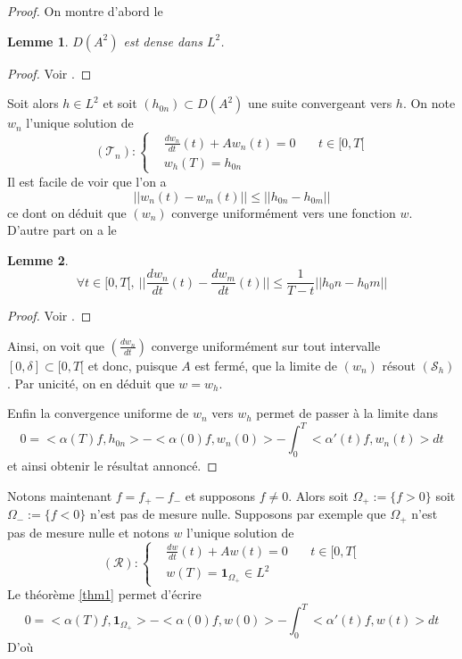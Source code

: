 \documentclass[a4paper]{book}
\newtheorem{lem}{Lemme}[chapter]
\begin{document}
\begin{proof}
    On montre d'abord le
    \begin{lem}
        $D(A^2)$ est dense dans $L^2$.
    \end{lem}
    \begin{proof}
        Voir \cite{HB}.
    \end{proof}
    Soit alors $h\in L^2$ et soit $(h_{0n})\subset D(A^2)$ une suite convergeant vers $h$. On note $w_n$ l'unique solution de
    \[(\mathcal{T}_n):\left\lbrace\begin{aligned}
             & \frac{dw_n}{dt}(t)+A w_n(t)=0 & \  & t\in[0,T[ \\
             & w_h(T)=h_{0n}
        \end{aligned}\right. \]
    Il est facile de voir que l'on a
    \[||w_n(t)-w_m(t)||\leq ||h_{0n}-h_{0m}|| \]
    ce dont on déduit que $(w_n)$ converge uniformément vers une fonction $w$.
    D'autre part on a le
    \begin{lem}
        \[\forall t\in [0,T[,\ ||\frac{dw_n}{dt}(t)-\frac{dw_m}{dt}(t)||\leq\frac{1}{T-t} ||h_0n-h_0m|| \]
    \end{lem}
    \begin{proof}
        Voir \cite{HB}.
    \end{proof}
    Ainsi, on voit que $(\frac{dw_n}{dt})$ converge uniformément sur tout intervalle $[0,\delta]\subset [0,T[$ et donc, puisque $A$ est fermé, que la limite de $(w_n)$ résout $(\mathcal{S}_h)$. Par unicité, on en déduit que $w=w_h$.

    Enfin la convergence uniforme de $w_n$ vers $w_h$ permet de passer à la limite dans
    \[0=<\alpha(T)f,h_{0n}> - <\alpha(0)f,w_n(0)> - \int_{0}^{T}<\alpha'(t)f,w_n(t)>dt\]
    et ainsi obtenir le résultat annoncé.

\end{proof}
Notons maintenant $f=f_+-f_-$ et supposons $f\neq0$. Alors soit $\Omega_+:=\{f>0\}$ soit $\Omega_-:=\{f<0\}$ n'est pas de mesure nulle. Supposons par exemple que $\Omega_+$ n'est pas de mesure nulle et notons $w$ l'unique solution de
\[(\mathcal{R}):\left\lbrace\begin{aligned}
         & \frac{dw}{dt}(t)+A w(t)=0         & \  & t\in[0,T[ \\
         & w(T)=\mathbf{1}_{\Omega_+}\in L^2
    \end{aligned}\right. \]
Le théorème \ref{thm1} permet d'écrire
\[0=<\alpha(T)f,\mathbf{1}_{\Omega_+}> - <\alpha(0)f,w(0)> - \int_{0}^{T}<\alpha'(t)f,w(t)>dt\]
D'où
\end{document}
